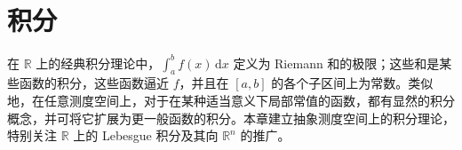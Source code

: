\documentclass[../main.tex]{subfiles} %
\begin{document}
\chapter{积分}\label{chapter:ch02-integration}

在 $\mathbb{R}$ 上的经典积分理论中，$\int_a^b f(x)\,\mathrm{d}x$ 定义为 Riemann 和的极限；这些和是某些函数的积分，这些函数逼近 $f$，并且在 $[a,b]$ 的各个子区间上为常数。类似地，在任意测度空间上，对于在某种适当意义下局部常值的函数，都有显然的积分概念，并可将它扩展为更一般函数的积分。本章建立抽象测度空间上的积分理论，特别关注 $\mathbb{R}$ 上的 Lebesgue 积分及其向 $\mathbb{R}^n$ 的推广。








\end{document}
